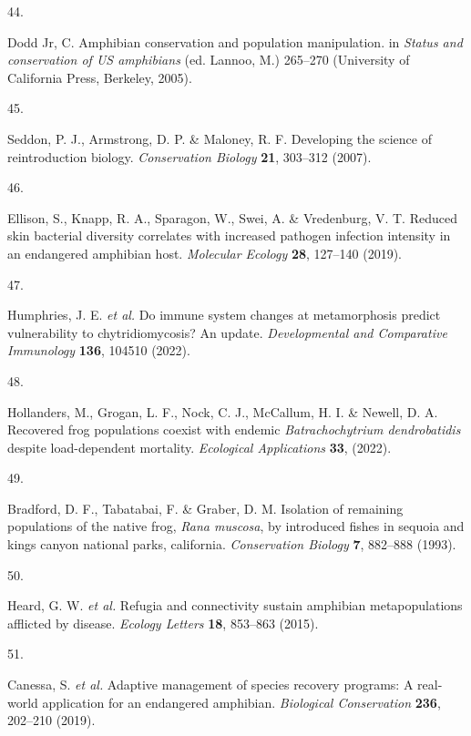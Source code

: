 \documentclass[
  letterpaper,
  DIV=11,
  numbers=noendperiod]{scrartcl}
\newlength{\cslhangindent}
\newlength{\csllabelwidth}
\newenvironment{CSLReferences}[2] %
 {\begin{list}{}{%
  \setlength{\itemindent}{0pt}
  \setlength{\leftmargin}{0pt}
  \setlength{\parsep}{0pt}
  \ifodd #1
   \setlength{\leftmargin}{\cslhangindent}
   \setlength{\itemindent}{-1\cslhangindent}
  \fi
  \setlength{\itemsep}{#2\baselineskip}}}
 {\end{list}}
\newcommand{\CSLLeftMargin}[1]{\parbox[t]{\csllabelwidth}{\strut#1\strut}}
\newcommand{\CSLRightInline}[1]{\parbox[t]{\linewidth - \csllabelwidth}{\strut#1\strut}}
\begin{document}
\begin{CSLReferences}{0}{0}
\CSLLeftMargin{44. }%
\CSLRightInline{Dodd Jr, C. Amphibian conservation and population
manipulation. in \emph{Status and conservation of {US} amphibians} (ed.
Lannoo, M.) 265--270 (University of California Press, Berkeley, 2005).}

\CSLLeftMargin{45. }%
\CSLRightInline{Seddon, P. J., Armstrong, D. P. \& Maloney, R. F.
Developing the science of reintroduction biology. \emph{Conservation
Biology} \textbf{21}, 303--312 (2007).}

\CSLLeftMargin{46. }%
\CSLRightInline{Ellison, S., Knapp, R. A., Sparagon, W., Swei, A. \&
Vredenburg, V. T. Reduced skin bacterial diversity correlates with
increased pathogen infection intensity in an endangered amphibian host.
\emph{Molecular Ecology} \textbf{28}, 127--140 (2019).}

\CSLLeftMargin{47. }%
\CSLRightInline{Humphries, J. E. \emph{et al.} Do immune system changes
at metamorphosis predict vulnerability to chytridiomycosis? {A}n update.
\emph{{Developmental and Comparative Immunology}} \textbf{136}, 104510
(2022).}

\CSLLeftMargin{48. }%
\CSLRightInline{Hollanders, M., Grogan, L. F., Nock, C. J., McCallum, H.
I. \& Newell, D. A. {Recovered frog populations coexist with endemic
\emph{Batrachochytrium dendrobatidis} despite load{-}dependent
mortality}. \emph{Ecological Applications} \textbf{33}, (2022).}

\CSLLeftMargin{49. }%
\CSLRightInline{Bradford, D. F., Tabatabai, F. \& Graber, D. M.
Isolation of remaining populations of the native frog, {\emph{{R}ana
muscosa}}, by introduced fishes in sequoia and kings canyon national
parks, california. \emph{Conservation Biology} \textbf{7}, 882--888
(1993).}

\CSLLeftMargin{50. }%
\CSLRightInline{Heard, G. W. \emph{et al.} Refugia and connectivity
sustain amphibian metapopulations afflicted by disease. \emph{Ecology
Letters} \textbf{18}, 853--863 (2015).}

\CSLLeftMargin{51. }%
\CSLRightInline{Canessa, S. \emph{et al.} Adaptive management of species
recovery programs: A real-world application for an endangered amphibian.
\emph{Biological Conservation} \textbf{236}, 202--210 (2019).}


\end{CSLReferences}
\end{document}
